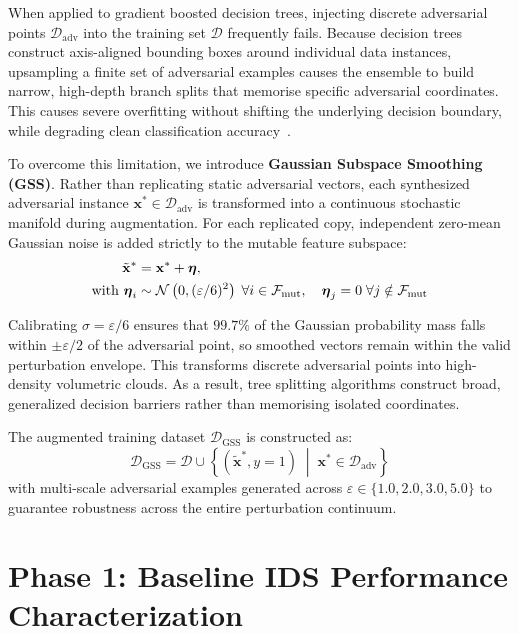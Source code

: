 \documentclass[final,5p,times,twocolumn]{elsarticle}
\begin{document}
When applied to gradient boosted decision trees, injecting discrete adversarial points $\mathcal{D}_{\text{adv}}$ into the training set $\mathcal{D}$ frequently fails. Because decision trees construct axis-aligned bounding boxes around individual data instances, upsampling a finite set of adversarial examples causes the ensemble to build narrow, high-depth branch splits that memorise specific adversarial coordinates. This causes severe overfitting without shifting the underlying decision boundary, while degrading clean classification accuracy~\cite{tramer2020adaptive}.

To overcome this limitation, we introduce \textbf{Gaussian Subspace Smoothing (GSS)}. Rather than replicating static adversarial vectors, each synthesized adversarial instance $\mathbf{x}^* \in \mathcal{D}_{\text{adv}}$ is transformed into a continuous stochastic manifold during augmentation. For each replicated copy, independent zero-mean Gaussian noise is added strictly to the mutable feature subspace:
\begin{align}
    \tilde{\mathbf{x}}^* &= \mathbf{x}^* + \boldsymbol{\eta}, \notag \\
    \text{with } \boldsymbol{\eta}_i &\sim \mathcal{N}\left(0, (\varepsilon/6)^2\right) \;\forall i \in \mathcal{F}_{\text{mut}}, \quad \boldsymbol{\eta}_j = 0 \;\forall j \notin \mathcal{F}_{\text{mut}}
\end{align}

Calibrating $\sigma = \varepsilon/6$ ensures that $99.7\%$ of the Gaussian probability mass falls within $\pm \varepsilon/2$ of the adversarial point, so smoothed vectors remain within the valid perturbation envelope. This transforms discrete adversarial points into high-density volumetric clouds. As a result, tree splitting algorithms construct broad, generalized decision barriers rather than memorising isolated coordinates.

The augmented training dataset $\mathcal{D}_{\text{GSS}}$ is constructed as:
\begin{equation}
    \mathcal{D}_{\text{GSS}} = \mathcal{D} \cup \left\{ (\tilde{\mathbf{x}}^*, y=1) \;\middle|\; \mathbf{x}^* \in \mathcal{D}_{\text{adv}} \right\}
\end{equation}
with multi-scale adversarial examples generated across $\varepsilon \in \{1.0, 2.0, 3.0, 5.0\}$ to guarantee robustness across the entire perturbation continuum.

\section{Phase 1: Baseline IDS Performance Characterization}
\label{sec:phase1}
\end{document}
